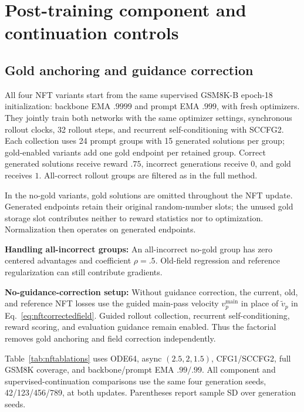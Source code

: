 \documentclass{article}
\newenvironment{revision}{\begingroup\color{blue}}{\endgroup}
\begin{document}
\clearpage
\clearpage
\begin{revision}
\section{Post-training component and continuation controls}
\label{app:nftcontrols}
\subsection{Gold anchoring and guidance correction}
All four NFT variants start from the same supervised GSM8K-B epoch-18 initialization: backbone EMA $.9999$ and prompt EMA $.999$, with fresh optimizers. They jointly train both networks with the same optimizer settings, synchronous rollout clocks, 32 rollout steps, and recurrent self-conditioning with SCCFG2. Each collection uses 24 prompt groups with 15 generated solutions per group; gold-enabled variants add one gold endpoint per retained group. Correct generated solutions receive reward $.75$, incorrect generations receive $0$, and gold receives $1$. All-correct rollout groups are filtered as in the full method.

In the no-gold variants, gold solutions are omitted throughout the NFT update. Generated endpoints retain their original random-number slots; the unused gold storage slot contributes neither to reward statistics nor to optimization. Normalization then operates on generated endpoints.

\textbf{Handling all-incorrect groups: } An all-incorrect no-gold group has zero centered advantages and coefficient $\rho=.5$. Old-field regression and reference regularization can still contribute gradients.

\textbf{No-guidance-correction setup: } Without guidance correction, the current, old, and reference NFT losses use the guided main-pass velocity $v_p^{\mathrm{main}}$ in place of $\widetilde v_p$ in Eq.~\eqref{eq:nftcorrectedfield}. Guided rollout collection, recurrent self-conditioning, reward scoring, and evaluation guidance remain enabled. Thus the factorial removes gold anchoring and field correction independently.

Table~\ref{tab:nftablations} uses ODE64, async $(2.5,2,1.5)$, CFG1/SCCFG2, full GSM8K coverage, and backbone/prompt EMA $.99/.99$. All component and supervised-continuation comparisons use the same four generation seeds, 42/123/456/789, at both updates. Parentheses report sample SD over generation seeds.


\end{revision}
\end{document}
